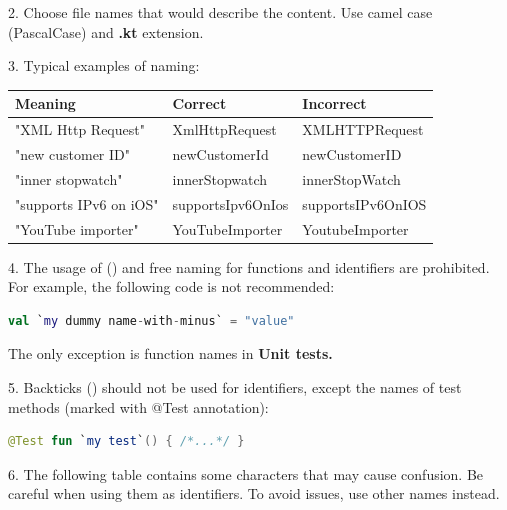 {{{{{{{{2.	Choose file names that would describe the content. Use camel case (PascalCase) and \textbf{.kt} extension.



3.	Typical examples of naming:



\begin{center}

\begin{tabular}{ |p{5.0cm}|p{5.0cm}|p{5.0cm}| }

\hline

Meaning&Correct&Incorrect\\

\hline

 "XML Http Request" & XmlHttpRequest & XMLHTTPRequest \\

 "new customer ID" & newCustomerId & newCustomerID \\

 "inner stopwatch" & innerStopwatch & innerStopWatch \\

 "supports IPv6 on iOS" & supportsIpv6OnIos & supportsIPv6OnIOS \\

 "YouTube importer" & YouTubeImporter & YoutubeImporter \\

\hline

\end{tabular}

\end{center}

4.	The usage of (\textbf{}) and free naming for functions and identifiers are prohibited. For example, the following code is not recommended:



\begin{lstlisting}[language=Kotlin]
val `my dummy name-with-minus` = "value" 
\end{lstlisting}


The only exception is function names in \textbf{Unit tests.}



5.	Backticks (\textbf{}) should not be used for identifiers, except the names of test methods (marked with @Test annotation):

\begin{lstlisting}[language=Kotlin]
 @Test fun `my test`() { /*...*/ }
\end{lstlisting}
6.  The following table contains some characters that may cause confusion. Be careful when using them as identifiers. To avoid issues, use other names instead.

}}}}}}}}
